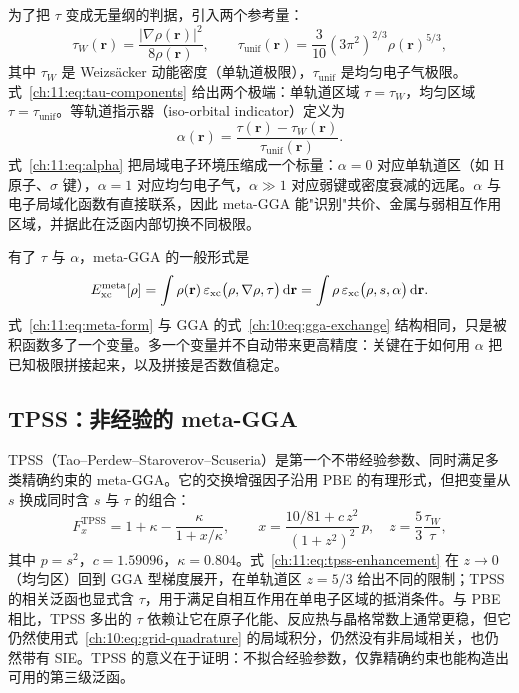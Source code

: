 为了把 $\tau$ 变成无量纲的判据，引入两个参考量：
\begin{equation}
\tau_W(\mathbf r)=\frac{\lvert\nabla\rho(\mathbf r)\rvert^2}{8\rho(\mathbf r)},
\qquad
\tau_{\mathrm{unif}}(\mathbf r)=\frac{3}{10}(3\pi^2)^{2/3}\rho(\mathbf r)^{5/3},
\label{ch:11:eq:tau-components}
\end{equation}
其中 $\tau_W$ 是 Weizsäcker 动能密度（单轨道极限），$\tau_{\mathrm{unif}}$ 是均匀电子气极限。式~\eqref{ch:11:eq:tau-components} 给出两个极端：单轨道区域 $\tau=\tau_W$，均匀区域 $\tau=\tau_{\mathrm{unif}}$。等轨道指示器（iso-orbital indicator）定义为
\begin{equation}
\alpha(\mathbf r)=\frac{\tau(\mathbf r)-\tau_W(\mathbf r)}{\tau_{\mathrm{unif}}(\mathbf r)} .
\label{ch:11:eq:alpha}
\end{equation}
式~\eqref{ch:11:eq:alpha} 把局域电子环境压缩成一个标量：$\alpha=0$ 对应单轨道区（如 H 原子、$\sigma$ 键），$\alpha=1$ 对应均匀电子气，$\alpha\gg 1$ 对应弱键或密度衰减的远尾。$\alpha$ 与电子局域化函数有直接联系，因此 meta-GGA 能"识别"共价、金属与弱相互作用区域，并据此在泛函内部切换不同极限。

有了 $\tau$ 与 $\alpha$，meta-GGA 的一般形式是
\begin{equation}
E_{\mathrm{xc}}^{\mathrm{meta}}[\rho]
= \int \rho(\mathbf r)\,\varepsilon_{\mathrm{xc}}\big(\rho,\nabla\rho,\tau\big)\,\mathrm{d}\mathbf r
= \int \rho\,\varepsilon_{\mathrm{xc}}\big(\rho,s,\alpha\big)\,\mathrm{d}\mathbf r .
\label{ch:11:eq:meta-form}
\end{equation}
式~\eqref{ch:11:eq:meta-form} 与 GGA 的式~\eqref{ch:10:eq:gga-exchange} 结构相同，只是被积函数多了一个变量。多一个变量并不自动带来更高精度：关键在于如何用 $\alpha$ 把已知极限拼接起来，以及拼接是否数值稳定。

\subsection{TPSS：非经验的 meta-GGA}
\label{ch:11:sec:tpss}

TPSS（Tao--Perdew--Staroverov--Scuseria）是第一个不带经验参数、同时满足多类精确约束的 meta-GGA\citep{tao2003}。它的交换增强因子沿用 PBE 的有理形式，但把变量从 $s$ 换成同时含 $s$ 与 $\tau$ 的组合：
\begin{equation}
F_x^{\mathrm{TPSS}}
= 1+\kappa-\frac{\kappa}{1+x/\kappa},
\qquad
x=\frac{10/81+c\,z^2}{(1+z^2)^2}\,p,
\quad
z=\frac{5}{3}\frac{\tau_W}{\tau},
\label{ch:11:eq:tpss-enhancement}
\end{equation}
其中 $p=s^2$，$c=1.59096$，$\kappa=0.804$。式~\eqref{ch:11:eq:tpss-enhancement} 在 $z\to 0$（均匀区）回到 GGA 型梯度展开，在单轨道区 $z=5/3$ 给出不同的限制；TPSS 的相关泛函也显式含 $\tau$，用于满足自相互作用在单电子区域的抵消条件。与 PBE 相比，TPSS 多出的 $\tau$ 依赖让它在原子化能、反应热与晶格常数上通常更稳，但它仍然使用式~\eqref{ch:10:eq:grid-quadrature} 的局域积分，仍然没有非局域相关，也仍然带有 SIE。TPSS 的意义在于证明：不拟合经验参数，仅靠精确约束也能构造出可用的第三级泛函。

